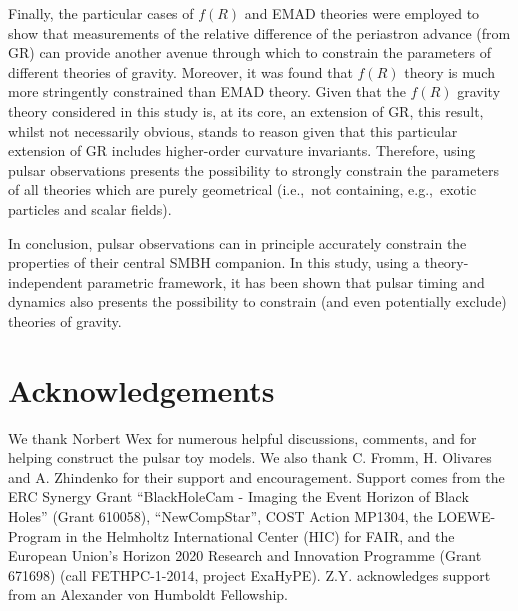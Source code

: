 \documentclass[a4paper,aps,twocolumn,showpacs,showkeys,nofootinbib,preprintnumbers,superscriptaddress,amsmath,amssymb,amsfonts]{revtex4-1}
\newcommand{\ie}{{i.e.,}~}
\newcommand{\eg}{{e.g.,}~}
\begin{document}
Finally, the particular cases of $f(R)$ and EMAD theories were employed to
show that measurements of the relative difference of the periastron advance
(from GR) can provide another avenue through which to constrain the parameters
of different theories of gravity.
Moreover, it was found that $f(R)$ theory is much more stringently constrained
than EMAD theory.
Given that the $f(R)$ gravity theory considered in this study is, at its core,
an extension of GR, this result, whilst not necessarily obvious, 
stands to reason given that this particular extension of GR includes
higher-order curvature invariants.
Therefore, using pulsar observations presents the possibility to strongly
constrain the parameters of all theories which are purely geometrical
(\ie not containing, \eg exotic particles and scalar fields).

In conclusion, pulsar observations can in principle accurately constrain the properties
of their central SMBH companion.
In this study, using a theory-independent parametric framework, it has
been shown that pulsar timing and dynamics also presents the possibility to
constrain (and even potentially exclude) theories of gravity.

\section*{Acknowledgements}

We thank Norbert Wex for numerous helpful discussions,
comments, and for helping construct the pulsar toy models.
We also thank C. Fromm, H. Olivares and A. Zhindenko for their
support and encouragement.
Support comes from the ERC Synergy Grant
``BlackHoleCam - Imaging the Event Horizon of Black Holes'' (Grant
610058), ``NewCompStar'', COST Action MP1304, the LOEWE-Program in
the Helmholtz International Center (HIC) for FAIR, and the European
Union's Horizon 2020 Research and Innovation Programme (Grant 671698)
(call FETHPC-1-2014, project ExaHyPE). 
Z.Y. acknowledges support from an Alexander von Humboldt Fellowship.



\end{document}
